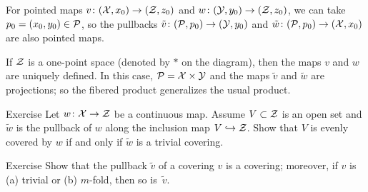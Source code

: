 For pointed maps $v\colon(\mathcal{X},x_0)\to (\mathcal{Z},z_0)$ and $w\colon(\mathcal{Y}, y_0)\to (\mathcal{Z},z_0)$,
we can take $p_0=(x_0,y_0)\in \mathcal{P}$, so
the pullbacks $\tilde v\:(\c{P},p_0)\z\to(\c{Y},y_0)$ and $\tilde w\colon(\mathcal{P},p_0)\to(\mathcal{X},x_0)$ are also pointed maps.

{

\begin{figure}
\vskip-1mm
\centering
{}
\end{figure}

If $\mathcal{Z}$ is a one-point space (denoted by $*$ on the diagram), then the maps $v$ and $w$ are uniquely defined.
In this case, $\mathcal{P}=\mathcal{X}\times \mathcal{Y}$ and the maps $\tilde v$ and $\tilde w$ are projections; so the fibered product generalizes the usual product.

}

\begin{thm}{Exercise}\label{ex:evenly-trivial}
Let $w\colon\mathcal{X}\to \mathcal{Z}$ be a continuous map.
Assume $V\z\subset \c{Z}$ is an open set and $\tilde w$ is the pullback of $w$ along the inclusion map $V\z\hookrightarrow\c{Z}$.
Show that $V$ is evenly covered by $w$ if and only if $\tilde w$ is a trivial covering.
\end{thm}

\begin{thm}[!]{Exercise}\label{ex:pull-back}
Show that the pullback $\tilde v$ of a covering $v$ is a covering; moreover, if $v$ is (a) trivial or (b) $m$-fold, then so is~$\tilde v$.
\end{thm}


